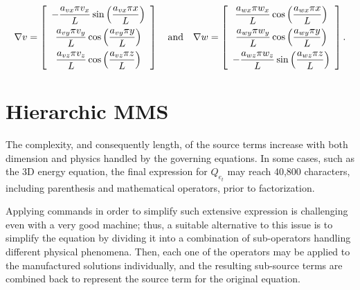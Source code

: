 \documentclass[10pt]{article}
\begin{document}
\begin{equation*}
\nabla  v= \left[ \begin{array}{c}
-  \dfrac{  a_{vx}  \pi v_x}{L}  \sin\left( \dfrac{ a_{vx}  \pi  x}{L}\right)\vspace{5pt}\\
    \dfrac{  a_{vy}  \pi v_y}{L} \cos\left( \dfrac{ a_{vy}  \pi  y}{L}\right)\vspace{5pt}\\
   \dfrac{  a_{vz}  \pi v_z }{L} \cos\left( \dfrac{ a_{vz}  \pi  z}{L}\right)
\end{array} \right]
\quad\mbox{and}\quad
\nabla w = \left[ \begin{array}{c}
\dfrac{  a_{wx}  \pi  w_x}{L} \cos\left( \dfrac{ a_{wx}  \pi  x}{L}\right)\vspace{5pt}\\
  \dfrac{  a_{wy}  \pi w_y}{L}  \cos\left( \dfrac{ a_{wy}  \pi  y}{L}\right)\vspace{5pt} \\
 - \dfrac{  a_{wz}  \pi w_z}{L}  \sin\left( \dfrac{ a_{wz}  \pi  z}{L}\right)
\end{array} \right].
\end{equation*}
\section{Hierarchic MMS}

The complexity, and consequently length, of the source terms increase with both dimension and physics handled by the governing equations. In some cases, such as the 3D energy equation, the final expression for $Q_{e_t}$ may reach 40,800 characters, including parenthesis and mathematical operators, prior to factorization.

Applying commands in order to simplify such extensive expression is challenging even with a very good machine; thus, a suitable alternative to this issue is to simplify the equation by dividing it into a combination of sub-operators handling different physical phenomena. Then, each one of the operators may be applied to the manufactured solutions individually, and the resulting sub-source terms are combined back to represent the source term for the original equation.
\end{document}

